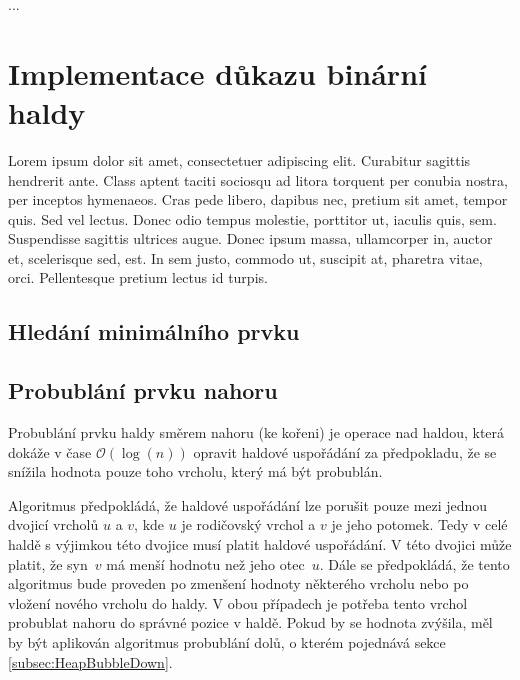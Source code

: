 \begin{definition}
...
\end{definition}


\chapter{Implementace důkazu binární haldy}

Lorem ipsum dolor sit amet, consectetuer adipiscing elit. Curabitur sagittis hendrerit ante. Class aptent taciti sociosqu ad litora torquent per conubia nostra, per inceptos hymenaeos. Cras pede libero, dapibus nec, pretium sit amet, tempor quis. Sed vel lectus. Donec odio tempus molestie, porttitor ut, iaculis quis, sem. Suspendisse sagittis ultrices augue. Donec ipsum massa, ullamcorper in, auctor et, scelerisque sed, est. In sem justo, commodo ut, suscipit at, pharetra vitae, orci. Pellentesque pretium lectus id turpis.

\section{Hledání minimálního prvku}
\label{subsec:HeapFindMin}

\section{Probublání prvku nahoru}
\label{subsec:HeapBubbleUp}

Probublání prvku haldy směrem nahoru (ke kořeni) je operace nad haldou, která dokáže v čase $\mathcal{O}(\log(n))$ opravit haldové uspořádání za předpokladu, že se snížila hodnota pouze toho vrcholu, který má být probublán.

Algoritmus předpokládá, že haldové uspořádání lze porušit pouze mezi jednou dvojicí vrcholů $u$ a $v$, kde $u$ je rodičovský vrchol a $v$ je jeho potomek. Tedy v celé haldě s výjimkou této dvojice musí platit haldové uspořádání. V této dvojici může platit, že syn~$v$ má menší hodnotu než jeho otec~$u$. Dále se předpokládá, že tento algoritmus bude proveden po zmenšení hodnoty některého vrcholu nebo po vložení nového vrcholu do haldy. V obou případech je potřeba tento vrchol probublat nahoru do správné pozice v haldě. Pokud by se hodnota zvýšila, měl by být aplikován algoritmus probublání dolů, o kterém pojednává sekce \ref{subsec:HeapBubbleDown}.

